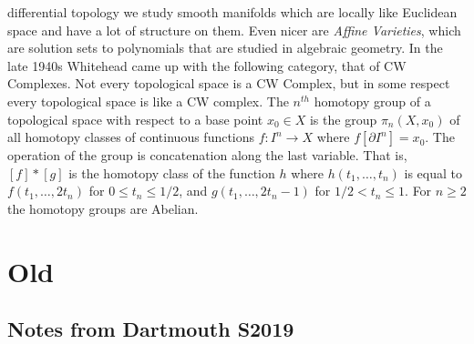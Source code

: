 \documentclass{book}                                                           %
\begin{document}
        differential topology we study smooth manifolds which are locally like
        Euclidean space and have a lot of structure on them. Even nicer are
        \textit{Affine Varieties}, which are solution sets to polynomials that are
        studied in algebraic geometry. In the late 1940s Whitehead came up with the
        following category, that of CW Complexes. Not every topological space is a
        CW Complex, but in some respect every topological space is like a CW
        complex. The $n^{th}$ homotopy group of a topological space with respect
        to a base point $x_{0}\in{X}$ is the group $\pi_{n}(X,x_{0})$ of all
        homotopy classes of continuous functions $f:I^{n}\rightarrow{X}$
        where $f[\partial{I}^{n}]=x_{0}$. The operation of the group is
        concatenation along the last variable. That is, $[f]*[g]$ is the homotopy
        class of the function $h$ where $h(t_{1},\dots,t_{n})$ is equal to
        $f(t_{1},\dots,2t_{n})$ for $0\leq{t}_{n}\leq{1}/2$, and
        $g(t_{1},\dots,2t_{n}-1)$ for $1/2<t_{n}\leq{1}$. For $n\geq{2}$ the
        homotopy groups are Abelian.
\chapter{Old}
    \section{Notes from Dartmouth S2019}
\end{document}
